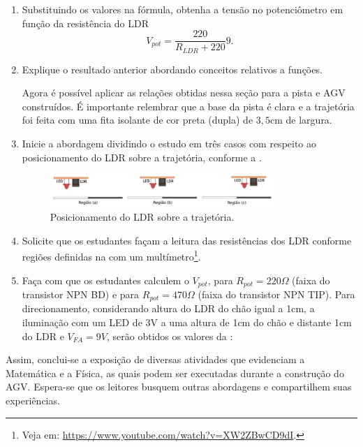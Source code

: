 \documentclass{textolivre-html}
\begin{document}
\begin{enumerate}
\item Substituindo os valores na fórmula, obtenha a tensão no potenciômetro em função da resistência do LDR 
$$ 
V_{pot} = \frac{220}{R_{LDR} + 220} 9 .
$$

\item Explique o resultado anterior abordando conceitos relativos a funções.

Agora é possível aplicar as relações obtidas nessa seção para a pista e AGV
construídos. É importante relembrar que a base da pista é clara e a trajetória
foi feita com uma fita isolante de cor preta (dupla) de $3,5$cm de largura.

\item Inicie a abordagem dividindo o estudo em três casos com respeito ao
posicionamento do LDR sobre a trajetória, conforme a .

\begin{figure}[h!]
\centering
\includegraphics[width=0.8\textwidth]{figure-35.pdf}
\caption{Posicionamento do LDR sobre a trajetória.}
\label{fig25}
\end{figure}

\item Solicite que os estudantes façam a leitura das resistências dos LDR
conforme regiões definidas na  com um multímetro\footnote{Veja em:
\url{https://www.youtube.com/watch?v=XW2ZBwCD9dI}.}.

\item Faça com que os estudantes calculem o $V_{pot}$, para $R_{pot} = 220\Omega$ (faixa do transistor NPN
BD) e para $R_{pot} = 470 \Omega$ (faixa do transistor NPN TIP). Para direcionamento, considerando
altura do LDR do chão igual a 1cm, a iluminação com um LED de 3V a uma altura
de 1cm do chão e distante 1cm do LDR e $V_{FA}=9V$, serão obtidos os valores da :

\end{enumerate}




Assim, conclui-se a exposição de diversas atividades que evidenciam a
Matemática e a Física, as quais podem ser executadas durante a construção do
AGV. Espera-se que os leitores busquem outras abordagens e compartilhem suas
experiências.
\end{document}
